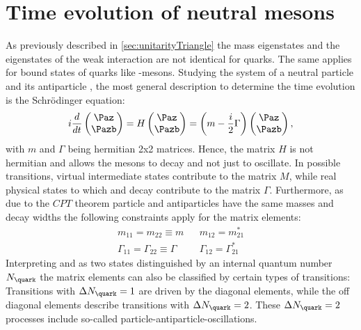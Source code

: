 \section[head={Time evolution of neutral mesons},tocentry={Time evolution of neutral mesons}]{Time evolution of neutral mesons}
\label{sec:TimeEvolution}

As previously described in \cref{sec:unitarityTriangle} the mass eigenstates and the eigenstates of the weak interaction are not identical for quarks.
The same applies for bound states of quarks like \B-mesons.
Studying the system of a neutral particle \Paz and its antiparticle \Pazb, the most general description to determine the time evolution is the Schrödinger equation:
\begin{equation}
i\frac{d}{dt}\begin{pmatrix} \Paz \\ \Pazb \end{pmatrix} = H \begin{pmatrix} \Paz \\ \Pazb \end{pmatrix}
=\left(m-\frac{i}{2}\Gamma\right)\begin{pmatrix} \Paz \\ \Pazb \end{pmatrix}, \label{eq:mixMatrix}
\end{equation}
with $m$ and $\Gamma$ being hermitian 2x2 matrices.
Hence, the matrix $H$ is not hermitian and allows the \B mesons to decay and not just to oscillate.
In possible transitions, virtual intermediate states contribute to the matrix $M$, while real physical states to which \Paz and \Pazb decay contribute to the matrix $\Gamma$.
Furthermore, as due to the $CPT$ theorem particle and antiparticles have the same masses and decay widths the following constraints apply for the matrix elements:
\begin{equation}
\begin{aligned}
&m_{11}=m_{22}\equiv m&&m_{12}=m_{21}^\ast&\\
&\Gamma_{11}=\Gamma_{22}\equiv\Gamma&&\Gamma_{12}=\Gamma_{21}^\ast&
\end{aligned}
\end{equation}
Interpreting \Paz and \Pazb as two states distinguished by an internal quantum number $N_\quark$ the matrix elements can also be classified by certain types of transitions:
Transitions with $\Delta N_\quark=1$ are driven by the diagonal elements, while the off diagonal elements describe transitions with $\Delta N_\quark=2$.
These $\Delta N_\quark=2$ processes include so-called particle-antiparticle-oscillations.

